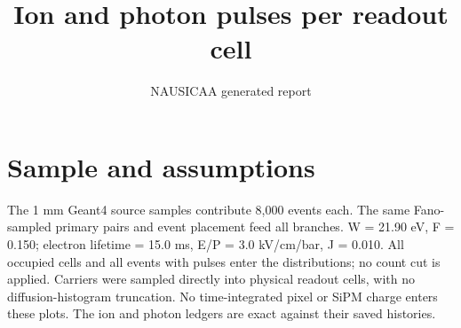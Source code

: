 \documentclass[11pt]{article}
\begin{document}
\title{Ion and photon pulses per readout cell}
\author{NAUSICAA generated report}
\date{}\maketitle
\section*{Sample and assumptions}
The 1 mm Geant4 source samples contribute 8,000 events each. The same Fano-sampled primary pairs and event placement feed all branches. W = 21.90 eV, F = 0.150; electron lifetime = 15.0 ms, E/P = 3.0 kV/cm/bar, J = 0.010. All occupied cells and all events with pulses enter the distributions; no count cut is applied. Carriers were sampled directly into physical readout cells, with no diffusion-histogram truncation. No time-integrated pixel or SiPM charge enters these plots. The ion and photon ledgers are exact against their saved histories.
\end{document}

